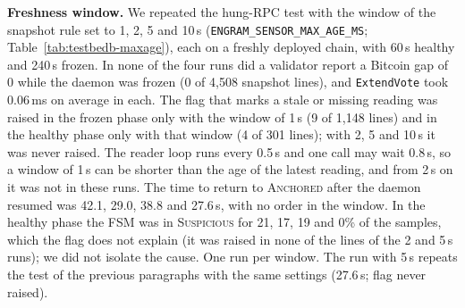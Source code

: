 \begin{table}[tbp]
\caption{\texttt{ExtendVote} time and block interval against the delay added to every Bitcoin RPC response (Testbed~B, 90\,s per value, one chain per build, no transaction load). The interval is the span of the highest sampled height over the window after the first 15\,s.}
\label{tab:testbedb-latency}
\centering
\scriptsize
\resizebox{\linewidth}{!}{}
\end{table}

\textbf{Freshness window.} We repeated the hung-RPC test with the window of the snapshot rule set to 1, 2, 5 and 10\,s (\texttt{ENGRAM\_SENSOR\_MAX\_AGE\_MS}; Table~\ref{tab:testbedb-maxage}), each on a freshly deployed chain, with 60\,s healthy and 240\,s frozen. In none of the four runs did a validator report a Bitcoin gap of 0 while the daemon was frozen (0 of 4{,}508 snapshot lines), and \texttt{ExtendVote} took 0.06\,ms on average in each. The flag that marks a stale or missing reading was raised in the frozen phase only with the window of 1\,s (9 of 1{,}148 lines) and in the healthy phase only with that window (4 of 301 lines); with 2, 5 and 10\,s it was never raised. The reader loop runs every 0.5\,s and one call may wait 0.8\,s, so a window of 1\,s can be shorter than the age of the latest reading, and from 2\,s on it was not in these runs. The time to return to \textsc{Anchored} after the daemon resumed was 42.1, 29.0, 38.8 and 27.6\,s, with no order in the window. In the healthy phase the FSM was in \textsc{Suspicious} for 21, 17, 19 and 0\% of the samples, which the flag does not explain (it was raised in none of the lines of the 2 and 5\,s runs); we did not isolate the cause. One run per window. The run with 5\,s repeats the test of the previous paragraphs with the same settings (27.6\,s; flag never raised).

\begin{table}[tbp]
\caption{Hung Bitcoin RPC with the freshness window of the snapshot rule set to 1, 2, 5 and 10\,s (Testbed~B, one freshly deployed chain per window, daemon frozen for 240\,s). ``Degraded'' counts the \texttt{sensor\_snapshot} lines that carry the flag for a missing or stale reading; ``healthy reads'' counts the lines of the frozen phase that report a Bitcoin gap of 0.}
\label{tab:testbedb-maxage}
\centering
\scriptsize
\resizebox{\linewidth}{!}{}
\end{table}
